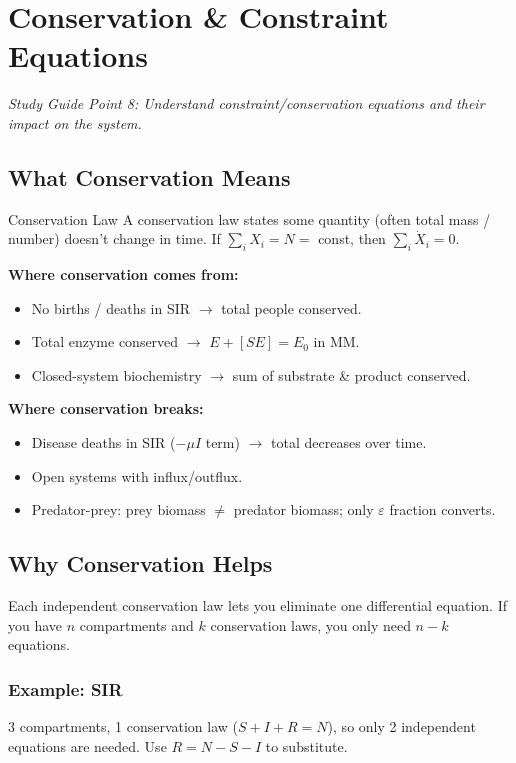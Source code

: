 \documentclass[11pt]{article}
\begin{document}
\section{Conservation \& Constraint Equations}

\textit{Study Guide Point 8: Understand constraint/conservation equations and their impact on the system.}

\subsection{What Conservation Means}

\begin{conceptbox}{Conservation Law}
A conservation law states some quantity (often total mass / number) doesn't change in time. If $\sum_i X_i = N = $ const, then $\sum_i \dot X_i = 0$.

\textbf{Where conservation comes from:}
\begin{itemize}
\item No births / deaths in SIR $\to$ total people conserved.
\item Total enzyme conserved $\to$ $E + [SE] = E_0$ in MM.
\item Closed-system biochemistry $\to$ sum of substrate \& product conserved.
\end{itemize}

\textbf{Where conservation breaks:}
\begin{itemize}
\item Disease deaths in SIR ($-\mu I$ term) $\to$ total decreases over time.
\item Open systems with influx/outflux.
\item Predator-prey: prey biomass $\neq$ predator biomass; only $\varepsilon$ fraction converts.
\end{itemize}
\end{conceptbox}

\subsection{Why Conservation Helps}

Each independent conservation law lets you eliminate one differential equation. If you have $n$ compartments and $k$ conservation laws, you only need $n - k$ equations.

\subsubsection{Example: SIR}
3 compartments, 1 conservation law ($S+I+R=N$), so only 2 independent equations are needed. Use $R = N - S - I$ to substitute.
\end{document}

